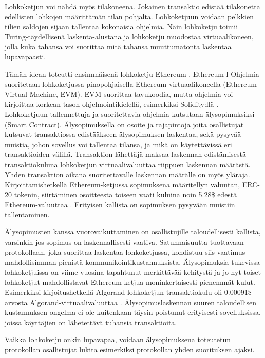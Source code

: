 Lohkoketjun voi nähdä myös tilakoneena. Jokainen transaktio edistää tilakonetta edellisten lohkojen määrittämän tilan pohjalta. Lohkoketjuun voidaan pelkkien tilien saldojen sijaan tallentaa kokonaisia ohjelmia. Näin lohkoketju toimii Turing-täydellisenä laskenta-alustana ja lohkoketju muodostaa virtuaalikoneen, jolla kuka tahansa voi suorittaa mitä tahansa muuttumatonta laskentaa lupavapaasti.

Tämän idean toteutti ensimmäisenä lohkoketju Ethereum \cite{buterin_ethereum_2014}. Ethereum-l
Ohjelmia suoritetaan lohkoketjussa pinopohjaisella Ethereum virtuaalikoneella (Ethereum Virtual Machine, EVM). EVM suorittaa tavukoodia, mutta ohjelmia voi kirjoittaa korkean tason ohjelmointikielellä, esimerkiksi Solidity:llä \cite{noauthor_solidity_nodate}. Lohkoketjuun tallennettuja ja suoritettavia ohjelmia kutsutaan älysopimuksiksi (Smart Contract).  Älysopimuksella on osoite ja rajapintoja joita osallistujat kutsuvat transaktiossa edistääkseen älysopimuksen laskentaa, sekä pysyvää muistia, johon sovellus voi tallentaa tilansa, ja mikä on käytettävissä eri transaktioiden välillä. Transaktion lähettäjä maksaa laskennan edistämisestä transaktiokuluna lohkoketjun virtuaalivaluuttaa riippuen laskennan määrästä. Yhden transaktion aikana suoritettavalle laskennan määrälle on myös yläraja. Kirjoittamishetkellä Ethereum-ketjussa sopimuksena määritellyn valuutan, ERC-20 tokenin, siirtäminen osoitteesta toiseen vaati kuluina noin 5.28\$ edestä Ethereum-valuuttaa \cite{etherscanio_ethereum_nodate}. Erityisen kallista on sopimuksen pysyvään muistiin tallentaminen.

Älysopimusten kanssa vuorovaikuttaminen on osallistujille taloudellisesti kallista, varsinkin jos sopimus on laskennallisesti vaativa. Satunnaisuutta tuottavaan protokollaan, joka suorittaa laskentaa lohkoketjussa, kohdistuu siis vaatimus mahdollisimman pienistä kommunikointikustannuksista. Älysopimuksia tukevissa lohkoketjuissa on viime vuosina tapahtunut merkittävää kehitystä ja jo nyt toiset lohkoketjut mahdollistavat Ethereum-ketjua moninkertaisesti pienemmät kulut. Esimerkiksi kirjoitushetkellä Algorand-lohkoketjun transaktiokulu oli 0.00091\$ arvosta Algorand-virtuaalivaluuttaa \cite{noauthor_algorand_nodate}. Älysopimuslaskennan suuren taloudellisen kustannuksen ongelma ei ole kuitenkaan täysin poistunut erityisesti sovelluksissa, joissa käyttäjien on lähetettävä tuhansia transaktioita.

Vaikka lohkoketju onkin lupavapaa, voidaan älysopimuksena toteutetun protokollan osallistujat lukita esimerkiksi protokollan yhden suorituksen ajaksi.

